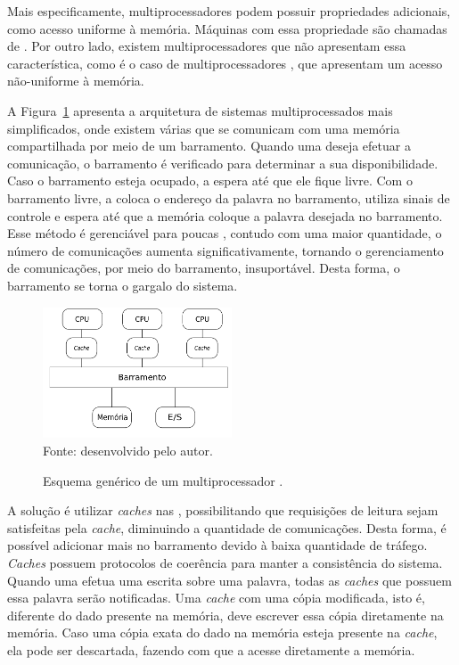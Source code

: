 Mais especificamente, multiprocessadores podem possuir propriedades adicionais,
como acesso uniforme à memória. Máquinas com essa propriedade são chamadas de
\uma. Por outro lado, existem multiprocessadores que não apresentam essa
característica, como é o caso de multiprocessadores \numa, que apresentam um acesso
não-uniforme à memória.


A Figura~\ref{fig:uma} apresenta a arquitetura de sistemas multiprocessados \uma
mais simplificados, onde existem várias \cpus que se
comunicam com uma memória compartilhada por meio de um barramento. Quando uma
\cpu deseja efetuar a comunicação, o barramento é verificado para
determinar a sua disponibilidade. Caso o barramento esteja ocupado, a
\cpu espera até que ele fique livre. Com o barramento livre, a \cpu
coloca o endereço da palavra no barramento, utiliza sinais de
controle e espera até que a memória coloque a palavra desejada no barramento. Esse
método é gerenciável para poucas \cpus, contudo com uma maior quantidade, o
número de comunicações aumenta significativamente, tornando
o gerenciamento de comunicações, por meio do barramento, insuportável. Desta
forma, o barramento se torna o gargalo do sistema.

\begin{figure}[t]
	\centering
    \caption{Esquema genérico de um multiprocessador \uma.}
    \includegraphics[width=0.5\textwidth]{figs/multiproc.pdf} \\
    Fonte: desenvolvido pelo autor.
    \label{fig:uma}
\end{figure}

A solução é utilizar \textit{caches} nas \cpus, possibilitando que requisições
de leitura sejam satisfeitas pela \textit{cache}, diminuindo a quantidade de
comunicações. Desta forma, é possível adicionar mais \cpus no barramento devido à baixa
quantidade de tráfego. \textit{Caches} possuem protocolos de coerência para
manter a consistência do sistema. Quando uma \cpu
efetua uma escrita sobre uma palavra, todas as \textit{caches} que possuem essa
palavra serão notificadas. Uma \textit{cache} com uma cópia modificada, isto é,
diferente do dado presente na memória, deve escrever essa cópia diretamente na
memória. Caso uma cópia exata do dado na memória esteja presente na
\textit{cache}, ela pode ser descartada, fazendo com que a \cpu acesse
diretamente a memória.

